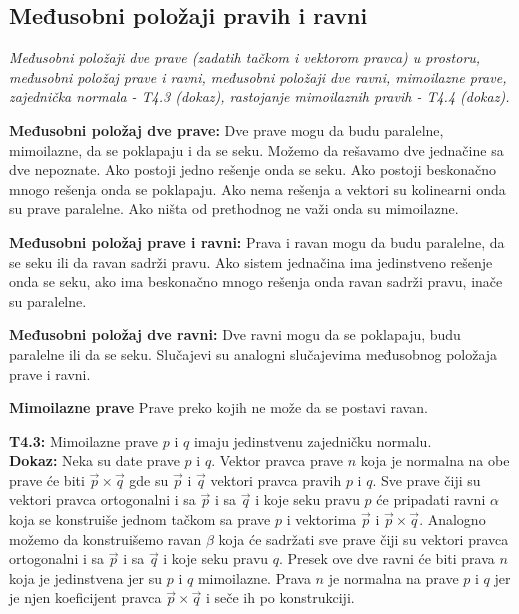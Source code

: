 \documentclass[12pt]{article}
\newcommand{\vek}[1]{\overrightarrow{#1}}
\begin{document}
\subsection{Međusobni položaji pravih i ravni}
\label{subsec:pitanje_16}
\textit{Međusobni položaji dve prave (zadatih tačkom i vektorom pravca) u
    prostoru, međusobni položaj prave i ravni, međusobni položaji dve ravni,
    mimoilazne prave, zajednička normala - T4.3 (dokaz), rastojanje mimoilaznih
    pravih - T4.4 (dokaz).}
\par
\vspace*{1cm}

\textbf{Međusobni položaj dve prave:} Dve prave mogu da budu paralelne,
mimoilazne, da se poklapaju i da se seku. Možemo da rešavamo dve jednačine sa
dve nepoznate. Ako postoji jedno rešenje onda se seku. Ako postoji beskonačno
mnogo rešenja onda se poklapaju. Ako nema rešenja a vektori su kolinearni onda
su prave paralelne. Ako ništa od prethodnog ne važi onda su mimoilazne.
\par

\textbf{Međusobni položaj prave i ravni:} Prava i ravan mogu da budu paralelne,
da se seku ili da ravan sadrži pravu. Ako sistem jednačina ima jedinstveno
rešenje onda se seku, ako ima beskonačno mnogo rešenja onda ravan sadrži pravu,
inače su paralelne.
\par

\textbf{Međusobni položaj dve ravni:} Dve ravni mogu da se poklapaju, budu
paralelne ili da se seku. Slučajevi su analogni slučajevima međusobnog položaja
prave i ravni.
\par

\textbf{Mimoilazne prave} Prave preko kojih ne može da se postavi ravan.
\par

\textbf{T4.3:} Mimoilazne prave $p$ i $q$ imaju jedinstvenu zajedničku normalu.
\\
\textbf{Dokaz:} Neka su date prave $p$ i $q$. Vektor pravca prave $n$ koja je
normalna na obe prave će biti $\vek{p}\times\vek{q}$ gde su $\vek{p}$ i
$\vek{q}$ vektori pravca pravih $p$ i $q$. Sve prave čiji su vektori pravca
ortogonalni i sa $\vek{p}$ i sa $\vek{q}$ i koje seku pravu $p$ će pripadati
ravni $\alpha$ koja se konstruiše jednom tačkom sa prave $p$ i vektorima
$\vek{p}$ i $\vek{p}\times\vek{q}$. Analogno možemo da konstruišemo ravan
$\beta$ koja će sadržati sve prave čiji su vektori pravca ortogonalni i sa
$\vek{p}$ i sa $\vek{q}$ i koje seku pravu $q$. Presek ove dve ravni će biti
prava $n$ koja je jedinstvena jer su $p$ i $q$ mimoilazne. Prava $n$ je
normalna na prave $p$ i $q$ jer je njen koeficijent pravca
$\vek{p}\times\vek{q}$ i seče ih po konstrukciji.
\par
\end{document}
